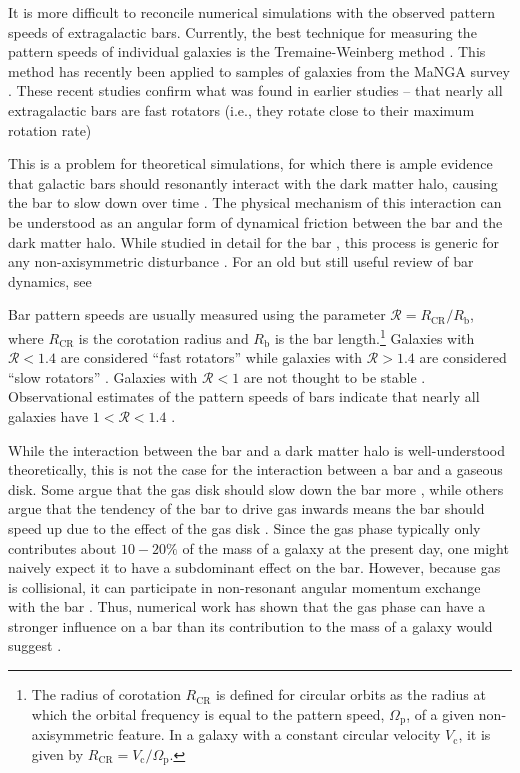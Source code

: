 \documentclass[fleqn,usenatbib]{mnras}
\newcommand{\RCR}{\ensuremath{R_{\textrm{CR}}}}
\newcommand{\Rot}{\ensuremath{\mathcal{R}}}
\newcommand{\Vc}{\ensuremath{V_{\textrm{c}} }}
\newcommand{\PS}{\ensuremath{\Omega_{\textrm{p}}}}
\newcommand{\Rb}{\ensuremath{R_{\textrm{b}}}}
\begin{document}
It is more difficult to reconcile numerical simulations with the observed
pattern speeds of extragalactic bars. Currently, the best technique for
measuring the pattern speeds of individual galaxies is the Tremaine-Weinberg
method \citep{1984ApJ...282L...5T, 2011MSAIS..18...23C}. This method has
recently been applied to samples of galaxies from the MaNGA survey
\citep{2019MNRAS.482.1733G, 2020MNRAS.491.3655G}. These recent studies confirm
what was found in earlier studies -- that nearly all extragalactic bars are fast
rotators (i.e., they rotate close to their maximum rotation rate)

This is a problem for theoretical simulations, for which there is ample evidence
that galactic bars should resonantly interact with the dark matter halo, causing
the bar to slow down over time \citep{1992ApJ...400...80H, 2000ApJ...543..704D,
2002MNRAS.330...35A, 2002ApJ...569L..83A, 2003MNRAS.341.1179A,
2003MNRAS.346..251O, 2005MNRAS.363..991H, 2006ApJ...637..214M,
2007MNRAS.375..460W, 2009ApJ...697..293D}. The physical mechanism of this
interaction can be understood as an angular form of dynamical friction between
the bar and the dark matter halo. While studied in detail for the bar
\citep{1984MNRAS.209..729T, 1985MNRAS.213..451W}, this process is generic for
any non-axisymmetric disturbance \citep{1972MNRAS.157....1L}. For an old but
still useful review of bar dynamics, see \citet{1993RPPh...56..173S}

Bar pattern speeds are usually measured using the parameter $\Rot=\RCR/\Rb$,
where \RCR{} is the corotation radius and \Rb{} is the bar length.\footnote{The
radius of corotation \RCR{} is defined for circular orbits as the radius at
which the orbital frequency is equal to the pattern speed, \PS{}, of a given
non-axisymmetric feature. In a galaxy with a constant circular velocity \Vc{},
it is given by $\RCR = \Vc / \PS$.} Galaxies with $\Rot < 1.4$ are considered
``fast rotators'' while galaxies with $\Rot > 1.4$ are considered ``slow
rotators'' \citep{2000ApJ...543..704D}. Galaxies with $\Rot < 1$ are not thought
to be stable \citep{1980AA....81..198C}. Observational estimates of the pattern
speeds of bars indicate that nearly all galaxies have $1 < \Rot <
1.4$ \citep{2011MSAIS..18...23C, 2015AA...576A.102A, 2019MNRAS.482.1733G,
2020MNRAS.491.3655G}.

While the interaction between the bar and a dark matter halo is well-understood
theoretically, this is not the case for the interaction between a bar and a
gaseous disk. Some argue that the gas disk should slow down the bar more
\citep{2003MNRAS.341.1179A}, while others argue that the tendency of the bar to
drive gas inwards means the bar should speed up due to the effect of the gas
disk \citep{2013MNRAS.429.1949A, 2014MNRAS.438L..81A}. Since the gas phase
typically only contributes about $10-20\%$ of the mass of a galaxy at the
present day, one might naively expect it to have a subdominant effect on the
bar. However, because gas is collisional, it can participate in non-resonant
angular momentum exchange with the bar \citep{2011MNRAS.415.1027H}. Thus,
numerical work has shown that the gas phase can have a stronger influence on a
bar than its contribution to the mass of a galaxy would suggest
\citep{2010ApJ...719.1470V, 2013MNRAS.429.1949A}.
\end{document}
